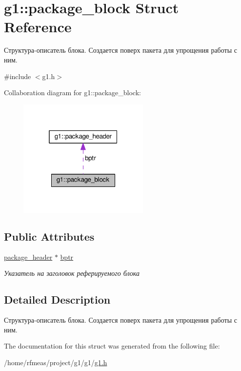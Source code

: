 \hypertarget{structg1_1_1package__block}{}\section{g1\+:\+:package\+\_\+block Struct Reference}
\label{structg1_1_1package__block}


Структура-\/описатель блока. Создается поверх пакета для упрощения работы с ним.  




{\ttfamily \#include $<$g1.\+h$>$}



Collaboration diagram for g1\+:\+:package\+\_\+block\+:\nopagebreak
\begin{figure}[H]
\begin{center}
\leavevmode
\includegraphics[width=184pt]{structg1_1_1package__block__coll__graph}
\end{center}
\end{figure}
\subsection*{Public Attributes}
\begin{DoxyCompactItemize}
\item 
\hyperlink{structg1_1_1package__header}{package\+\_\+header} $\ast$ \hyperlink{structg1_1_1package__block_a4a5e269f8e769f8691c15aa56046eb79}{bptr}\hypertarget{structg1_1_1package__block_a4a5e269f8e769f8691c15aa56046eb79}{}\label{structg1_1_1package__block_a4a5e269f8e769f8691c15aa56046eb79}

\begin{DoxyCompactList}\small\item\em Указатель на заголовок реферируемого блока \end{DoxyCompactList}\end{DoxyCompactItemize}


\subsection{Detailed Description}
Структура-\/описатель блока. Создается поверх пакета для упрощения работы с ним. 

The documentation for this struct was generated from the following file\+:\begin{DoxyCompactItemize}
\item 
/home/rfmeas/project/g1/g1/\hyperlink{g1_8h}{g1.\+h}\end{DoxyCompactItemize}

